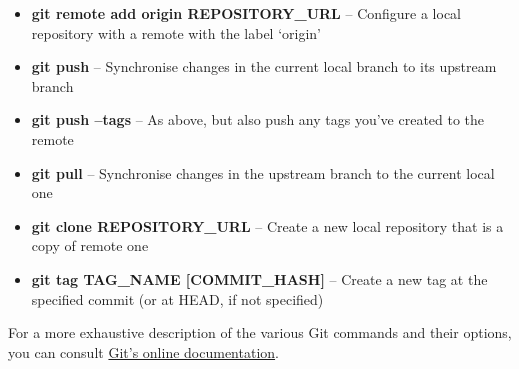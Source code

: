 \documentclass[9pt]{extarticle}
\begin{document}
\begin{bluebox}[title=Git Command Cheat Sheet]
\begin{itemize}
  \item \textbf{git remote add origin REPOSITORY\_URL} -- Configure a local repository
    with a remote with the label `origin'
  \item \textbf{git push} -- Synchronise changes in the current local branch to its
    upstream branch
  \item \textbf{git push --tags} -- As above, but also push any tags you've created to
    the remote
  \item \textbf{git pull} -- Synchronise changes in the upstream branch to the current
    local one
  \item \textbf{git clone REPOSITORY\_URL} -- Create a new local repository that is a
    copy of remote one
  \item \textbf{git tag TAG\_NAME [COMMIT\_HASH]} -- Create a new tag at the specified
    commit (or at HEAD, if not specified)
  \end{itemize}
\end{bluebox}

For a more exhaustive description of the various Git commands and their options, you can
consult \href{https://git-scm.com/docs}{Git's online documentation}.


\furtherhelp
\end{document}
